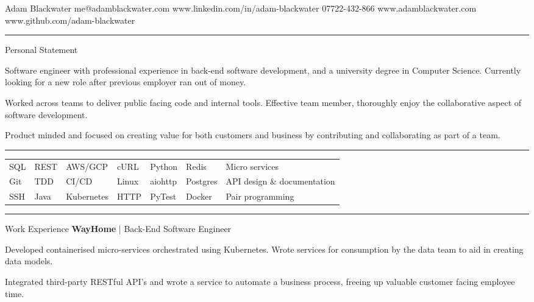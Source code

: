 \documentclass[12pt,twoside]{article}
\begin{document}
\topheading
    {Adam Blackwater}
    {me@adamblackwater.com }
    {www.linkedin.com/in/adam-blackwater}
    {07722-432-866}
    {www.adamblackwater.com}
    {www.github.com/adam-blackwater}

\vspace{0.6em}
\hrule
\vspace{0.6em}

\statement
    {Personal Statement}
    {
        Software engineer with professional experience in back-end software
        development, and a university degree in Computer Science. Currently
        looking for a new role after previous employer ran out of money.

        \hspace{1.5em}Worked across teams to deliver public facing code and
        internal tools. Effective team member, thoroughly enjoy the
        collaborative aspect of software development.

        \hspace{1.5em}Product minded and focused on creating value for both
        customers and business by contributing and collaborating as part of a
        team.
    }

\vspace{0.8em}
\hrule
\vspace{0.8em}

\begin{center}
    \begin{tabular}{l l l l l l l}
        SQL & REST & AWS/GCP & cURL & Python & Redis & Micro services \\
        Git & TDD & CI/CD & Linux & aiohttp & Postgres & API design \& documentation \\
        SSH & Java & Kubernetes & HTTP & PyTest& Docker & Pair programming
    \end{tabular}
\end{center}

\hrule
\vspace{0.8em}

\headedsection
    {Work Experience}
    {
        \textbf{WayHome} | Back-End Software Engineer}
    {
        Developed containerised micro-services orchestrated using Kubernetes. Wrote
        services for consumption by the data team to aid in creating data models.

        \hspace{1.5em}Integrated third-party RESTful API's and wrote a service to
        automate a business process, freeing up valuable customer facing
        employee time.
    }
\end{document}
